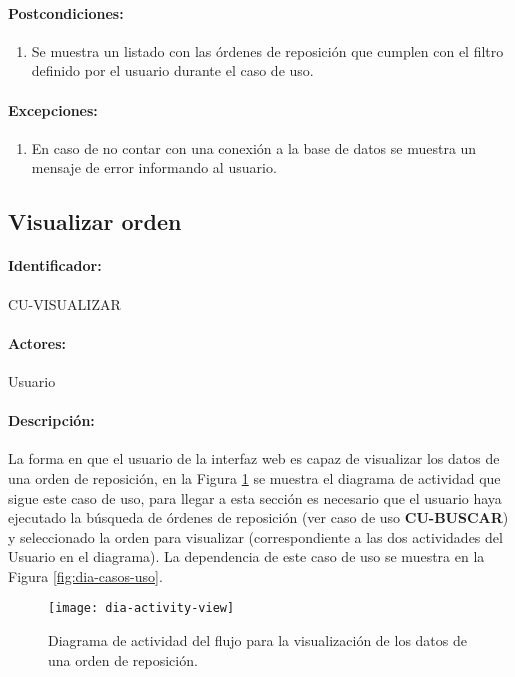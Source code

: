 \paragraph{Postcondiciones:}
\begin{enumerate}
  \item Se muestra un listado con las órdenes de reposición que cumplen con el filtro definido por el usuario durante el caso de uso.
\end{enumerate}
\paragraph{Excepciones:}
\begin{enumerate}
  \item En caso de no contar con una conexión a la base de datos se muestra un mensaje de error informando al usuario.
\end{enumerate}


\subsection{Visualizar orden}\label{cu-visualizar}
\paragraph{Identificador:}
CU-VISUALIZAR
\paragraph{Actores:}
Usuario
\paragraph{Descripción:}
La forma en que el usuario de la interfaz web es capaz de visualizar los datos de una orden de reposición, en la Figura \ref{fig:dia-activity-view} se muestra el diagrama de actividad que sigue este caso de uso, para llegar a esta sección es necesario que el usuario haya ejecutado la búsqueda de órdenes de reposición (ver caso de uso \textbf{CU-BUSCAR}) y seleccionado la orden para visualizar (correspondiente a las dos actividades del Usuario en el diagrama). La dependencia de este caso de uso se muestra en la Figura \ref{fig:dia-casos-uso}.
\begin{figure}[h]
  \centering
  \texttt{[image: dia-activity-view]}
  \caption{Diagrama de actividad del flujo para la visualización de los datos de una orden de reposición.}
  \label{fig:dia-activity-view}
\end{figure}
